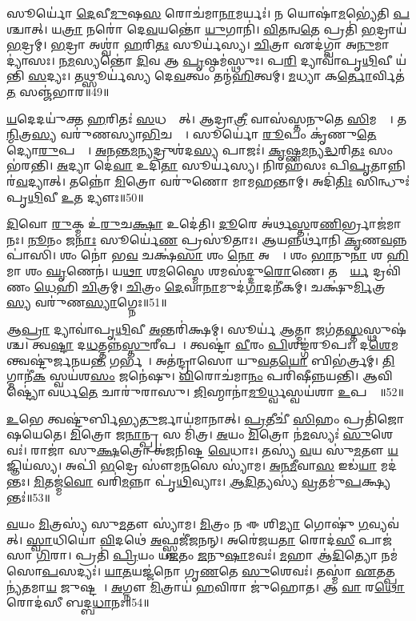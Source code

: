 𑌸𑍂𑌰𑍍𑌯𑍋॑ \ul{𑌦𑍇}𑌵𑍀\ul{𑌮𑍁}𑌷\ul{𑌸}\ul{} 𑌰𑍋𑌚॑𑌮𑌾\ul{𑌨𑌾}𑌮𑌰𑍍𑌯𑌃॑।
𑌨 𑌯𑍋𑌷𑌾॑\ul{𑌮}𑌭𑍍𑌯𑍇॑𑌤𑌿 \ul{𑌪}𑌶𑍍𑌚𑌾𑌤𑍍।
𑌯\ul{𑌤𑍍𑌰𑌾} 𑌨𑌰𑍋॑ 𑌦𑍇\ul{𑌵}𑌯𑌨𑍍𑌤𑍋॑ \ul{𑌯𑍁}𑌗𑌾𑌨𑌿॑।
\ul{𑌵𑌿}\ul{𑌤}𑌨𑍍𑌵\ul{𑌤𑍇} 𑌪𑍍𑌰𑌤𑌿॑ \ul{𑌭}𑌦𑍍𑌰𑌾𑌯॑ \ul{𑌭}𑌦𑍍𑌰𑌮𑍍।
\ul{𑌭}𑌦𑍍𑌰𑌾 𑌅𑌶𑍍𑌵𑌾॑ \ul{𑌹}𑌰𑌿\ul{𑌤𑌃} 𑌸𑍂𑌰𑍍𑌯॑𑌸𑍍𑌯।
\ul{𑌚𑌿}𑌤𑍍𑌰𑌾 𑌏𑌦॑𑌗𑍍𑌵𑌾 𑌅\ul{𑌨𑍁}𑌮𑌾𑌦𑍍𑌯𑌾॑𑌸𑌃।
\ul{𑌨}\ul{𑌮}𑌸𑍍𑌯𑌨𑍍𑌤𑍋॑ \ul{𑌦𑌿}𑌵 𑌆 \ul{𑌪𑍃}𑌷𑍍𑌠𑌮॑𑌸𑍍𑌥𑍁𑌃।
𑌪\ul{𑌰𑌿} 𑌦𑍍𑌯𑌾𑌵𑌾॑𑌪𑍃\ul{𑌥𑌿}𑌵𑍀 𑌯॑𑌨𑍍𑌤𑌿 \ul{𑌸}𑌦𑍍𑌯𑌃।
𑌤𑌥𑍍𑌸𑍂𑌰𑍍𑌯॑𑌸𑍍𑌯 𑌦𑍇\ul{𑌵}𑌤𑍍𑌵𑌂 𑌤𑌨𑍍𑌮॑\ul{𑌹𑌿}𑌤𑍍𑌵𑌮𑍍।
\ul{𑌮}𑌧𑍍𑌯𑌾 𑌕\ul{𑌰𑍍𑌤𑍋}𑌰𑍍𑌵𑌿𑌤॑\ul{𑌤}\ul{} 𑌸𑌞𑍍𑌜॑𑌭𑌾𑌰॥49॥

\ul{𑌯}𑌦𑍇𑌦𑌯𑍁॑𑌕𑍍𑌤 \ul{𑌹}𑌰𑌿𑌤𑌃॑ \ul{𑌸}𑌧𑌸𑍍𑌥𑌾᳚𑌤𑍍।
𑌆𑌦𑍍𑌰𑌾\ul{𑌤𑍍𑌰𑍀} 𑌵𑌾𑌸॑𑌸𑍍𑌤𑌨𑍁𑌤𑍇 \ul{𑌸𑌿}𑌮𑌸𑍍𑌮𑍈᳚।
𑌤\ul{𑌨𑍍𑌮𑌿}𑌤𑍍𑌰\ul{𑌸𑍍𑌯} 𑌵𑌰𑍁॑𑌣𑌸𑍍𑌯𑌾\ul{𑌭𑌿}𑌚𑌕𑍍𑌷𑍇᳚।
𑌸𑍂𑌰𑍍𑌯𑍋॑ \ul{𑌰𑍂}𑌪𑌂 𑌕𑍃॑𑌣𑍁\ul{𑌤𑍇} 𑌦𑍍𑌯𑍋\ul{𑌰𑍁}𑌪𑌸𑍍𑌥𑍇᳚।
\ul{𑌅}\ul{𑌨}𑌨𑍍𑌤\ul{𑌮}𑌨𑍍𑌯𑌦𑍍𑌰𑍁𑌶॑𑌦\ul{𑌸𑍍𑌯} 𑌪𑌾𑌜𑌃॑।
\ul{𑌕𑍃}𑌷𑍍𑌣\ul{𑌮}𑌨𑍍𑌯\ul{𑌦𑍍𑌧}𑌰𑌿\ul{𑌤𑌃} 𑌸𑌂 𑌭॑𑌰𑌨𑍍𑌤𑌿।
\ul{𑌅}𑌦𑍍𑌯𑌾 𑌦𑍇॑\ul{𑌵𑌾} 𑌉𑌦𑌿॑\ul{𑌤𑌾} 𑌸𑍂𑌰𑍍𑌯॑𑌸𑍍𑌯।
𑌨𑌿𑌰𑌹॑𑌸𑌃 𑌪𑌿\ul{𑌪𑍃}𑌤𑌾𑌨𑍍𑌨𑌿𑌰॑\ul{𑌵}𑌦𑍍𑌯𑌾𑌤𑍍।
𑌤𑌨𑍍𑌨𑍋॑ \ul{𑌮𑌿}𑌤𑍍𑌰𑍋 𑌵𑌰𑍁॑𑌣𑍋 𑌮𑌾𑌮𑌹𑌨𑍍𑌤𑌾𑌮𑍍।
𑌅𑌦𑌿॑\ul{𑌤𑌿𑌃} 𑌸𑌿𑌨𑍍𑌧𑍁𑌃॑ 𑌪𑍃\ul{𑌥𑌿}𑌵𑍀 \ul{𑌉}𑌤 𑌦𑍍𑌯𑍗𑌃॥50॥

\ul{𑌦𑌿}𑌵𑍋 \ul{𑌰𑍁}𑌕𑍍𑌮 𑌉॑\ul{𑌰𑍁}𑌚\ul{𑌕𑍍𑌷𑌾} 𑌉𑌦𑍇॑𑌤𑌿।
\ul{𑌦𑍂}𑌰𑍇 𑌅॑𑌰𑍍𑌥\ul{𑌸𑍍𑌤}𑌰\ul{𑌣𑌿}𑌰𑍍𑌭𑍍𑌰𑌾𑌜॑𑌮𑌾𑌨𑌃।
\ul{𑌨𑍂}𑌨𑌂 𑌜\ul{𑌨𑌾𑌃} 𑌸𑍂𑌰𑍍𑌯𑍇॑\ul{𑌣} 𑌪𑍍𑌰𑌸𑍂॑𑌤𑌾𑌃।
𑌆𑌯𑌨𑍍𑌨𑌰𑍍𑌥𑌾॑𑌨𑌿 \ul{𑌕𑍃}𑌣\ul{𑌵}𑌨𑍍𑌨𑌪𑌾॑𑌸𑌿।
𑌶𑌂 𑌨𑍋॑ 𑌭\ul{𑌵} 𑌚𑌕𑍍𑌷॑\ul{𑌸𑌾} 𑌶𑌂 \ul{𑌨𑍋} 𑌅𑌹𑍍𑌨𑌾᳚।
𑌶𑌂 \ul{𑌭𑌾}𑌨𑍁\ul{𑌨𑌾} 𑌶 \ul{𑌹𑌿}𑌮𑌾 𑌶𑌂 \ul{𑌘𑍃}𑌣𑍇𑌨॑।
𑌯\ul{𑌥𑌾} 𑌶\ul{𑌮}𑌸𑍍𑌮𑍈 𑌶𑌮𑌸॑𑌦𑍍𑌦𑍁\ul{𑌰𑍋}𑌣𑍇।
𑌤𑌥𑍍𑌸𑍂᳚\ul{𑌰𑍍𑌯} 𑌦𑍍𑌰𑌵𑌿॑𑌣𑌂 \ul{𑌧𑍇}𑌹𑌿 \ul{𑌚𑌿}𑌤𑍍𑌰𑌮𑍍।
\ul{𑌚𑌿}𑌤𑍍𑌰𑌂 \ul{𑌦𑍇}𑌵𑌾\ul{𑌨𑌾}𑌮𑍁𑌦॑\ul{𑌗𑌾}𑌦𑌨𑍀॑𑌕𑌮𑍍।
𑌚𑌕𑍍𑌷𑍁॑\ul{𑌰𑍍𑌮𑌿}𑌤𑍍𑌰\ul{𑌸𑍍𑌯} 𑌵𑌰𑍁॑𑌣\ul{𑌸𑍍𑌯𑌾}𑌗𑍍𑌨𑍇𑌃॥51॥

𑌆\ul{𑌪𑍍𑌰𑌾} 𑌦𑍍𑌯𑌾𑌵𑌾॑𑌪𑍃\ul{𑌥𑌿}𑌵𑍀 \ul{𑌅}𑌨𑍍𑌤𑌰𑌿॑𑌕𑍍𑌷𑌮𑍍।
𑌸𑍂𑌰𑍍𑌯॑ \ul{𑌆}𑌤𑍍𑌮𑌾 𑌜𑌗॑𑌤\ul{𑌸𑍍𑌤}𑌸𑍍𑌥𑍁𑌷॑𑌶𑍍𑌚।
𑌤𑍍𑌵\ul{𑌷𑍍𑌟𑌾} 𑌦\ul{𑌧}𑌤𑍍𑌤𑌨𑍍𑌨॑\ul{𑌸𑍍𑌤𑍁}𑌰𑍀𑌪𑌮𑍍᳚।
𑌤𑍍𑌵𑌷𑍍𑌟𑌾॑ \ul{𑌵𑍀}𑌰𑌂 \ul{𑌪𑌿}𑌶𑌙𑍍𑌗॑𑌰𑍂𑌪𑌃।
𑌦\ul{𑌶𑍇}𑌮𑌨𑍍𑌤𑍍𑌵𑌷𑍍𑌟𑍁॑𑌰𑍍𑌜𑌨𑌯\ul{𑌨𑍍𑌤} 𑌗𑌰𑍍𑌭𑌮𑍍᳚।
𑌅𑌤॑𑌨𑍍𑌦𑍍𑌰𑌾𑌸𑍋 𑌯𑍁\ul{𑌵}𑌤\ul{𑌯𑍋} 𑌬𑌿𑌭॑𑌰𑍍𑌤𑍍𑌰𑌮𑍍।
\ul{𑌤𑌿}𑌗𑍍𑌮𑌾𑌨𑍀॑\ul{𑌕}\ul{} 𑌸𑍍𑌵𑌯॑𑌶\ul{𑌸𑌂} 𑌜𑌨𑍇॑𑌷𑍁।
\ul{𑌵𑌿}𑌰𑍋𑌚॑𑌮𑌾\ul{𑌨𑌂} 𑌪𑌰𑌿॑𑌷𑍀𑌨𑍍𑌨𑌯𑌨𑍍𑌤𑌿।
𑌆𑌵𑌿𑌷𑍍𑌟𑍍𑌯𑍋॑ 𑌵𑌰𑍍𑌧\ul{𑌤𑍇} 𑌚𑌾𑌰𑍁॑𑌰𑌾𑌸𑍁।
\ul{𑌜𑌿}𑌹𑍍𑌮𑌾𑌨𑌾॑\ul{𑌮𑍂}𑌰𑍍𑌧𑍍𑌵𑌸𑍍𑌵𑌯॑𑌶𑌾 \ul{𑌉}𑌪𑌸𑍍𑌥𑍇᳚॥52॥

\ul{𑌉}𑌭𑍇 𑌤𑍍𑌵𑌷𑍍𑌟𑍁॑𑌰𑍍𑌬𑌿𑌭𑍍𑌯\ul{𑌤𑍁}𑌰𑍍𑌜𑌾𑌯॑𑌮𑌾𑌨𑌾𑌤𑍍।
\ul{𑌪𑍍𑌰}𑌤𑍀𑌚𑍀॑ \ul{𑌸𑌿}\ul{}𑌹𑌂 𑌪𑍍𑌰𑌤𑌿॑\-𑌜𑍋𑌷𑌯𑍇𑌤𑍇।
\ul{𑌮𑌿}𑌤𑍍𑌰𑍋 𑌜\ul{𑌨𑌾}𑌨𑍍𑌪𑍍𑌰 𑌸 𑌮𑌿॑𑌤𑍍𑌰।
\ul{𑌅}𑌯𑌂 \ul{𑌮𑌿}𑌤𑍍𑌰𑍋 𑌨॑\ul{𑌮}𑌸𑍍𑌯𑌃॑ \ul{𑌸𑍁}𑌶𑍇𑌵𑌃॑।
𑌰𑌾𑌜𑌾॑ 𑌸𑍁\ul{𑌕𑍍𑌷}𑌤𑍍𑌰𑍋 𑌅॑𑌜𑌨𑌿𑌷𑍍𑌟 \ul{𑌵𑍇}𑌧𑌾𑌃।
𑌤𑌸𑍍𑌯॑ \ul{𑌵}𑌯 𑌸𑍁॑\ul{𑌮}𑌤𑍗 \ul{𑌯}𑌜𑍍𑌞𑌿𑌯॑𑌸𑍍𑌯।
𑌅𑌪𑌿॑ \ul{𑌭}𑌦𑍍𑌰𑍇 𑌸𑍗॑𑌮\ul{𑌨}𑌸𑍇 𑌸𑍍𑌯𑌾॑𑌮।
\ul{𑌅}\ul{𑌨}\ul{𑌮𑍀}𑌵𑌾\ul{𑌸} 𑌇𑌡॑\ul{𑌯𑌾} 𑌮𑌦॑𑌨𑍍𑌤𑌃।
\ul{𑌮𑌿}𑌤𑌜𑍍𑌮॑\ul{𑌵𑍋} 𑌵𑌰𑌿॑\ul{𑌮}𑌨𑍍𑌨𑌾 𑌪𑍃॑\ul{𑌥𑌿}𑌵𑍍𑌯𑌾𑌃।
\ul{𑌆}\ul{𑌦𑌿}𑌤𑍍𑌯𑌸𑍍𑌯॑ \ul{𑌵𑍍𑌰}𑌤𑌮𑍁॑\ul{𑌪}𑌕𑍍𑌷𑍍𑌯𑌨𑍍𑌤𑌃॑॥53॥

\ul{𑌵}𑌯𑌂 \ul{𑌮𑌿}𑌤𑍍𑌰𑌸𑍍𑌯॑ 𑌸𑍁\ul{𑌮}𑌤𑍗 𑌸𑍍𑌯𑌾॑𑌮।
\ul{𑌮𑌿}𑌤𑍍𑌰𑌂 𑌨 𑌈 𑌶𑌿\ul{𑌮𑍍𑌯𑌾} 𑌗𑍋𑌷𑍁॑ \ul{𑌗}𑌵𑍍𑌯𑌵॑𑌤𑍍।
\ul{𑌸𑍍𑌵𑌾}𑌧𑌿𑌯𑍋॑ \ul{𑌵𑌿}𑌦𑌥𑍇॑ \ul{𑌅}𑌫𑍍𑌸𑍍𑌵𑌜𑍀॑𑌜𑌨𑌨𑍍।
𑌅𑌰𑍇॑𑌜𑌯\ul{𑌤𑌾}\ul{} 𑌰𑍋𑌦॑\ul{𑌸𑍀} 𑌪𑌾𑌜॑𑌸𑌾 \ul{𑌗𑌿}𑌰𑌾।
𑌪𑍍𑌰𑌤𑌿॑ \ul{𑌪𑍍𑌰𑌿}𑌯𑌂 𑌯॑\ul{𑌜}𑌤𑌂 \ul{𑌜}𑌨𑍁\ul{𑌷𑌾}𑌮𑌵𑌃॑।
\ul{𑌮}𑌹𑌾 𑌆॑\ul{𑌦𑌿}𑌤𑍍𑌯𑍋 𑌨𑌮॑𑌸𑍋\ul{𑌪}𑌸𑌦𑍍𑌯𑌃॑।
\ul{𑌯𑌾}\ul{𑌤}𑌯𑌜𑍍𑌜॑𑌨𑍋 𑌗𑍃\ul{𑌣}𑌤𑍇 \ul{𑌸𑍁}𑌶𑍇𑌵𑌃॑।
𑌤𑌸𑍍𑌮𑌾॑ \ul{𑌏}𑌤𑌤𑍍𑌪𑌨𑍍𑌯॑𑌤𑌮𑌾\ul{𑌯} 𑌜𑍁𑌷𑍍𑌟𑌮𑍍᳚।
\ul{𑌅}𑌗𑍍𑌨𑍗 \ul{𑌮𑌿}𑌤𑍍𑌰𑌾𑌯॑ \ul{𑌹}𑌵𑌿𑌰𑌾 𑌜𑍁॑𑌹𑍋𑌤।
𑌆 \ul{𑌵𑌾}\ul{} 𑌰\ul{𑌥𑍋} 𑌰𑍋𑌦॑𑌸𑍀 𑌬𑌦𑍍𑌬\ul{𑌧𑌾}𑌨𑌃॥54॥


